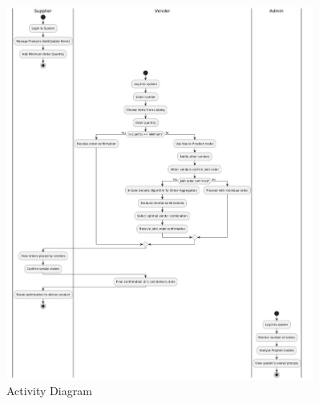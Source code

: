  \begin{figure}[H]
    \centering
    \includegraphics[width=0.9\textwidth]{Figures/Activity diagram.jpeg}
    \caption{Activity Diagram}
    \label{fig:activity-diagram}
\end{figure}

